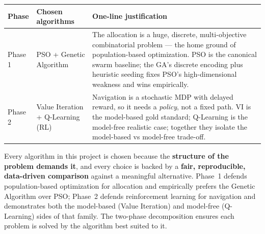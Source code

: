 \documentclass[11pt]{article}
\begin{document}
\begin{center}
\renewcommand{\arraystretch}{1.4}
\begin{tabular}{@{}p{2.3cm} p{4.6cm} p{5.8cm}@{}}
\toprule
\textbf{Phase} & \textbf{Chosen algorithms} & \textbf{One-line justification} \\
\midrule
Phase 1 & PSO + Genetic Algorithm & The allocation is a huge, discrete, multi-objective combinatorial problem --- the home ground of population-based optimization. PSO is the canonical swarm baseline; the GA's discrete encoding plus heuristic seeding fixes PSO's high-dimensional weakness and wins empirically. \\
Phase 2 & Value Iteration + Q-Learning (RL) & Navigation is a stochastic MDP with delayed reward, so it needs a \emph{policy}, not a fixed path. VI is the model-based gold standard; Q-Learning is the model-free realistic case; together they isolate the model-based vs model-free trade-off. \\
\bottomrule
\end{tabular}
\end{center}

\begin{tcolorbox}[colback=green!5!white,colframe=green!45!black,title=Closing statement]
Every algorithm in this project is chosen because the \textbf{structure of the
problem demands it}, and every choice is backed by a \textbf{fair, reproducible,
data-driven comparison} against a meaningful alternative. Phase~1 defends
population-based optimization for allocation and empirically prefers the Genetic
Algorithm over PSO; Phase~2 defends reinforcement learning for navigation and
demonstrates both the model-based (Value Iteration) and model-free (Q-Learning)
sides of that family. The two-phase decomposition ensures each problem is solved
by the algorithm best suited to it.
\end{tcolorbox}
\end{document}

